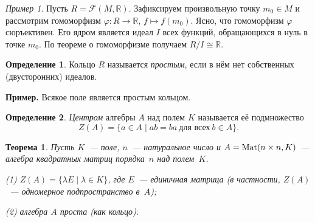 \documentclass[a4paper,10pt]{amsart}
\def\Mat{{\rm Mat}}%
\def\RR{{\mathbb R}}%
\def\FFF{\mathcal{F}}
\def\Mat{{\rm Mat}}
\newtheorem{theorem}{Теорема}
\theoremstyle{definition}
\newtheorem{definition}{Определение}
\theoremstyle{remark}
\newtheorem{example}{Пример}
\begin{document}
\begin{example}
Пусть $R = \FFF(M, \RR)$. Зафиксируем произвольную точку $m_0 \in M$
и рассмотрим гомоморфизм $\varphi \colon R \to \RR$, $f \mapsto
f(m_0)$. Ясно, что гомоморфизм $\varphi$ сюръективен. Его ядром
является идеал $I$ всех функций, обращающихся в нуль в точке $m_0$.
По теореме о гомоморфизме получаем $R / I \cong \RR$.
\end{example}

\begin{definition}
Кольцо $R$ называется {\it простым}, если в нём нет собственных
(двусторонних) идеалов.
\end{definition}

\textbf{Пример.} Всякое поле является простым кольцом.

\begin{definition}
\textit{Центром} алгебры $A$ над полем $K$ называется её
подмножество
$$
Z(A) = \{ a \in A \mid ab = ba \ \text{для всех} \ b \in A \}.
$$
\end{definition}

\begin{theorem}
Пусть $K$~--- поле, $n$~--- натуральное число и $A = \Mat(n \times
n, K)$~--- алгебра квадратных матриц порядка~$n$ над полем~$K$.

\textup{(1)} $Z(A) = \lbrace \lambda E \mid \lambda \in K \rbrace$,
где $E$~--- единичная матрица \textup(в частности, $Z(A)$~---
одномерное подпространство в~$A$\textup);

\textup{(2)} алгебра $A$ проста \textup(как кольцо\textup).
\end{theorem}
\end{document}
